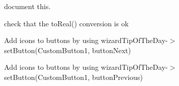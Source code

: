 \begin{DoxyRefList}
%
document this.  
\item[Member \mbox{\hyperlink{imgui__main_8c_a9c46d1b36fc04b5e871fb69cbeef6738}{text\+Size\+Selector\+Index\+Changed}} (int index)]\label{todo__todo000175}%
%
check that the to\+Real() conversion is ok  
\item[Member \mbox{\hyperlink{imgui__main_8c_ac1272afea42e08c828e1cb040ba5c903}{tip\+\_\+of\+\_\+the\+\_\+day\+\_\+dialog}} (void)]\label{todo__todo000031}%
%
Add icons to buttons by using wizard\+Tip\+Of\+The\+Day-\/\texorpdfstring{$>$}{>}set\+Button(\+Custom\+Button1, button\+Next)

\label{todo__todo000030}%
%
Add icons to buttons by using wizard\+Tip\+Of\+The\+Day-\/\texorpdfstring{$>$}{>}set\+Button(\+Custom\+Button1, button\+Previous)


\end{DoxyRefList}
